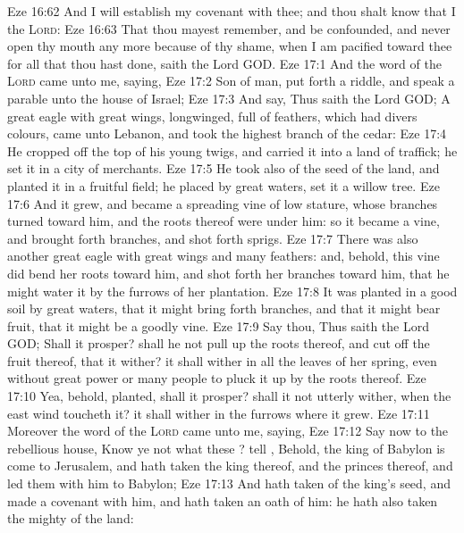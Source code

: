 \vs Eze 16:62 And I will establish my covenant with thee; and thou shalt know that I  the \textsc{Lord}:
\vs Eze 16:63 That thou mayest remember, and be confounded, and never open thy mouth any more because of thy shame, when I am pacified toward thee for all that thou hast done, saith the Lord GOD.
\vs Eze 17:1 And the word of the \textsc{Lord} came unto me, saying,
\vs Eze 17:2 Son of man, put forth a riddle, and speak a parable unto the house of Israel;
\vs Eze 17:3 And say, Thus saith the Lord GOD; A great eagle with great wings, longwinged, full of feathers, which had divers colours, came unto Lebanon, and took the highest branch of the cedar:
\vs Eze 17:4 He cropped off the top of his young twigs, and carried it into a land of traffick; he set it in a city of merchants.
\vs Eze 17:5 He took also of the seed of the land, and planted it in a fruitful field; he placed  by great waters,  set it  a willow tree.
\vs Eze 17:6 And it grew, and became a spreading vine of low stature, whose branches turned toward him, and the roots thereof were under him: so it became a vine, and brought forth branches, and shot forth sprigs.
\vs Eze 17:7 There was also another great eagle with great wings and many feathers: and, behold, this vine did bend her roots toward him, and shot forth her branches toward him, that he might water it by the furrows of her plantation.
\vs Eze 17:8 It was planted in a good soil by great waters, that it might bring forth branches, and that it might bear fruit, that it might be a goodly vine.
\vs Eze 17:9 Say thou, Thus saith the Lord GOD; Shall it prosper? shall he not pull up the roots thereof, and cut off the fruit thereof, that it wither? it shall wither in all the leaves of her spring, even without great power or many people to pluck it up by the roots thereof.
\vs Eze 17:10 Yea, behold,  planted, shall it prosper? shall it not utterly wither, when the east wind toucheth it? it shall wither in the furrows where it grew.
\vs Eze 17:11 Moreover the word of the \textsc{Lord} came unto me, saying,
\vs Eze 17:12 Say now to the rebellious house, Know ye not what these ? tell , Behold, the king of Babylon is come to Jerusalem, and hath taken the king thereof, and the princes thereof, and led them with him to Babylon;
\vs Eze 17:13 And hath taken of the king's seed, and made a covenant with him, and hath taken an oath of him: he hath also taken the mighty of the land:
